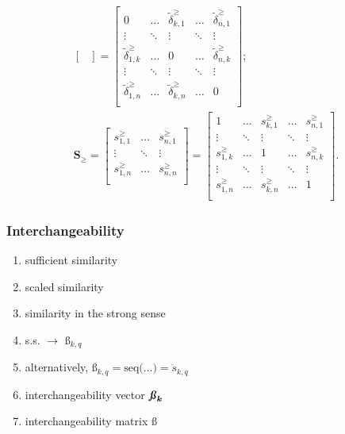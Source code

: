 \documentclass{elsarticle} %
\begin{document}
\begin{gather}
\begin{bmatrix}
    \end{bmatrix} =
    \begin{bmatrix}
        0                           & \hdots & \tilde{\delta}_{k,1}^{\geq} & \hdots & \tilde{\delta}_{n,1}^{\geq} \\
        \vdots                      & \ddots & \vdots                      & \ddots & \vdots                      \\
        \tilde{\delta}_{1,k}^{\geq} & \hdots & 0                           & \hdots & \tilde{\delta}_{n,k}^{\geq} \\
        \vdots                      & \ddots & \vdots                      & \ddots & \vdots                      \\
        \tilde{\delta}_{1,n}^{\geq} & \hdots & \tilde{\delta}_{k,n}^{\geq} & \hdots & 0                           \\
    \end{bmatrix}
    ;\\
    \textbf{S}_{\boldsymbol{\geq}} =
    \begin{bmatrix}
        s_{1,1}^{\geq} & \hdots & s_{n,1}^{\geq} \\
        \vdots         & \ddots & \vdots         \\
        s_{1,n}^{\geq} & \hdots & s_{n,n}^{\geq} \\
    \end{bmatrix} =
    \begin{bmatrix}
        1              & \hdots & s_{k,1}^{\geq} & \hdots & s_{n,1}^{\geq} \\
        \vdots         & \ddots & \vdots         & \ddots & \vdots         \\
        s_{1,k}^{\geq} & \hdots & 1              & \hdots & s_{n,k}^{\geq} \\
        \vdots         & \ddots & \vdots         & \ddots & \vdots         \\
        s_{1,n}^{\geq} & \hdots & s_{k,n}^{\geq} & \hdots & 1              \\
    \end{bmatrix}
    .
\end{gather}

\subsubsection{Interchangeability}
\begin{enumerate}
    \item sufficient similarity
    \item scaled similarity
    \item similarity in the strong sense
    \item s.s. $\rightarrow$ $\textit{\ss}_{k,q}$
    \item alternatively, $\textit{\ss}_{k,q} = \text{seq(...)} = \ddot{s}_{k,q}$
    \item interchangeability vector $\boldsymbol{\textbf{\textit{\ss}}_k}$
    \item interchangeability matrix $\boldsymbol{\textbf{\ss}}$
\end{enumerate}
\end{document}
